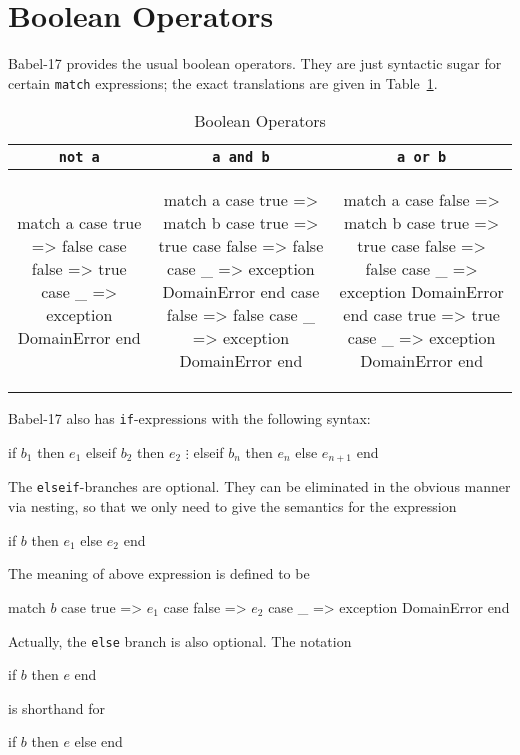 \documentclass[11pt]{amsart}
\newcommand{\babelsrc}[1] {\lstinline!#1!}
\begin{document}
\section{Boolean Operators}

Babel-17 provides the usual boolean operators. They are just syntactic sugar for certain \babelsrc{match} expressions; the exact translations are given in Table~\ref{tab:booleanops}.
\begin{table}
\caption{Boolean Operators}
\begin{tabular}{c|c|c}
\babelsrc{not a} & \babelsrc{a and b} &\babelsrc{a or b} \\\hline
 \small
\begin{babellisting}
match a 
  case true => 
    false 
  case false => 
    true
  case _ => 
    exception DomainError
end
\end{babellisting}
 & 
 \small
\begin{babellisting}
match a 
  case true => 
    match b 
      case true => 
        true
      case false => 
        false
      case _ => 
        exception DomainError
    end 
  case false => 
    false
  case _ => 
    exception DomainError
end
\end{babellisting}
 & 
 \small
\begin{babellisting}
match a 
  case false => 
    match b 
      case true => 
        true
      case false => 
        false
      case _ => 
        exception DomainError
    end 
  case true => 
    true
  case _ => 
    exception DomainError
end
\end{babellisting}
\end{tabular}
\label{tab:booleanops}
\end{table}
Babel-17 also has \babelsrc{if}-expressions with the following syntax:
\begin{babellisting}
if $b_1$ then
  $e_1$
elseif $b_2$ then
  $e_2$
  $\vdots$
elseif $b_n$ then
  $e_n$
else
  $e_{n+1}$
end
\end{babellisting}
The \babelsrc{elseif}-branches are  optional. They can be eliminated in the obvious manner via nesting, so that we only need to give the semantics for the expression 
\begin{babellisting}
if $b$ then $e_1$ else $e_2$ end
\end{babellisting}
The meaning of above expression is defined to be
\begin{babellisting}
match $b$ 
  case true => $e_1$
  case false => $e_2$
  case _ => exception DomainError 
end
\end{babellisting}
Actually, the  \babelsrc{else} branch is also optional. The notation
\begin{babellisting}
if $b$ then $e$  end
\end{babellisting}
is shorthand for
\begin{babellisting}
if $b$ then $e$  else end
\end{babellisting}
\end{document}
